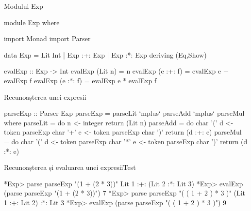 \documentclass[xcolor=x11names,compress,10pt]{beamer}
\begin{document}
  

\begin{frame}[fragile]{Modulul Exp}
\begin{asciihs}
  module Exp where

  import Monad
  import Parser

  data Exp = Lit Int
           | Exp :+: Exp
           | Exp :*: Exp
           deriving (Eq,Show)

  evalExp   :: Exp -> Int
  evalExp   (Lit n)    = n
  evalExp   (e :+: f) = evalExp e + evalExp f
  evalExp   (e :*: f) = evalExp e * evalExp f
\end{asciihs}
\end{frame}




\begin{frame}[fragile]{Recunoașterea unei expresii}
\begin{asciihs}
  parseExp :: Parser Exp
  parseExp = parseLit `mplus` parseAdd `mplus` parseMul
    where
    parseLit = do   n <- integer
                    return (Lit n)
    parseAdd = do   char '('
                    d <- token parseExp
                    char '+'
                    e <- token parseExp
                    char ')'
                    return (d :+: e)
    parseMul = do   char '('
                    d <- token parseExp
                    char '*'
                    e <- token parseExp
                    char ')'
                    return (d :*: e)
\end{asciihs}
\end{frame}



\begin{frame}[fragile]{Recunoașterea și evaluarea unei expresii}{Test}
\begin{asciihs}
  *Exp> parse parseExp "(1 + (2 * 3))"
  Lit 1 :+: (Lit 2 :*: Lit 3)
  *Exp> evalExp (parse parseExp "(1 + (2 * 3))")
  7
  *Exp> parse parseExp "( ( 1 + 2 ) * 3 )"
  (Lit 1 :+: Lit 2) :*: Lit 3
  *Exp> evalExp (parse parseExp "( ( 1 + 2 ) * 3 )")
  9
\end{asciihs}
\end{frame}

\begin{frame}{}
\vfill\begin{center}
\end{center}
\vfill
\end{frame}
\end{document}
